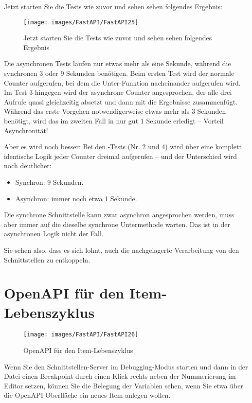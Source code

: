 Jetzt starten Sie die Tests wie zuvor und sehen sehen folgendes Ergebnis:

\begin{figure}
    \texttt{[image: images/FastAPI/FastAPI25]}
    \caption{Jetzt starten Sie die Tests wie zuvor und sehen sehen folgendes Ergebnis} \label{FastAPI25}
\end{figure}


Die asynchronen Tests laufen nur etwas mehr als eine Sekunde, während die synchronen 3 oder 9 Sekunden benötigen. Beim ersten Test wird der normale Counter aufgerufen, bei dem die Unter-Funktion nacheinander aufgerufen wird. Im Test 3 hingegen wird der asynchrone Counter angesprochen, der alle drei Aufrufe quasi gleichzeitig absetzt und dann mit  die Ergebnisse zusammenfügt. Während das erste Vorgehen notwendigerweise etwas mehr als 3 Sekunden benötigt, wird das im zweiten Fall in nur gut 1 Sekunde erledigt – Vorteil Asynchronität!

Aber es wird noch besser: Bei den -Tests (Nr. 2 und 4) wird über eine komplett identische Logik jeder Counter dreimal aufgerufen -- und der Unterschied wird noch deutlicher:

\begin{itemize}
  \item Synchron: 9 Sekunden.
  \item Asynchron: immer noch etwa 1 Sekunde.
\end{itemize}

Die synchrone Schnittstelle kann zwar asynchron angesprochen werden, muss aber immer auf die dieselbe synchrone Untermethode warten. Das ist in der asynchronen Logik nicht der Fall.

Sie sehen also, dass es sich lohnt, auch die nachgelagerte Verarbeitung von den Schnittstellen zu entkoppeln.

\section{OpenAPI für den Item-Lebenszyklus}

\begin{figure}
    \texttt{[image: images/FastAPI/FastAPI26]}
    \caption{OpenAPI für den Item-Lebenszyklus} \label{FastAPI26}
\end{figure}

Wenn Sie den Schnittstellen-Server im Debugging-Modus starten und dann in der Datei  einen Breakpoint durch einen Klick rechts neben der Nummerierung im Editor setzen, können Sie die Belegung der Variablen sehen, wenn Sie etwa über die OpenAPI-Oberfläche ein neues Item anlegen wollen.

